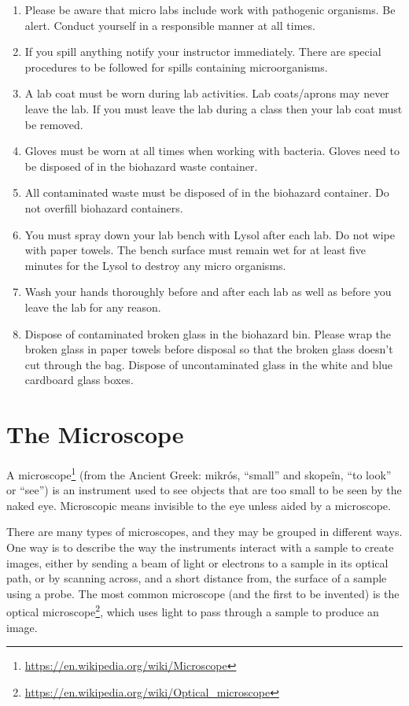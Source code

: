 \documentclass[]{book}
\providecommand{\tightlist}{%
  \setlength{\itemsep}{0pt}\setlength{\parskip}{0pt}}
\let\rmarkdownfootnote\footnote%
\def\footnote{\protect\rmarkdownfootnote}
\renewcommand{\href}[2]{#2\footnote{\url{#1}}}
\theoremstyle{definition}
\theoremstyle{definition}
\theoremstyle{definition}
\theoremstyle{remark}
\begin{document}
\begin{enumerate}
\def\labelenumi{\arabic{enumi}.}
\setcounter{enumi}{37}
\tightlist
\item
  Please be aware that micro labs include work with pathogenic
  organisms. Be alert. Conduct yourself in a responsible manner at all
  times.
\item
  If you spill anything notify your instructor immediately. There are
  special procedures to be followed for spills containing
  microorganisms.
\item
  A lab coat must be worn during lab activities. Lab coats/aprons may
  never leave the lab. If you must leave the lab during a class then
  your lab coat must be removed.
\item
  Gloves must be worn at all times when working with bacteria. Gloves
  need to be disposed of in the biohazard waste container.
\item
  All contaminated waste must be disposed of in the biohazard container.
  Do not overfill biohazard containers.
\item
  You must spray down your lab bench with Lysol after each lab. Do not
  wipe with paper towels. The bench surface must remain wet for at least
  five minutes for the Lysol to destroy any micro organisms.
\item
  Wash your hands thoroughly before and after each lab as well as before
  you leave the lab for any reason.
\item
  Dispose of contaminated broken glass in the biohazard bin. Please wrap
  the broken glass in paper towels before disposal so that the broken
  glass doesn't cut through the bag. Dispose of uncontaminated glass in
  the white and blue cardboard glass boxes.
\end{enumerate}

\chapter{The Microscope}\label{the-microscope}

A \href{https://en.wikipedia.org/wiki/Microscope}{microscope} (from the
Ancient Greek: mikrós, ``small'' and skopeîn, ``to look'' or ``see'') is
an instrument used to see objects that are too small to be seen by the
naked eye. Microscopic means invisible to the eye unless aided by a
microscope.

There are many types of microscopes, and they may be grouped in
different ways. One way is to describe the way the instruments interact
with a sample to create images, either by sending a beam of light or
electrons to a sample in its optical path, or by scanning across, and a
short distance from, the surface of a sample using a probe. The most
common microscope (and the first to be invented) is the
\href{https://en.wikipedia.org/wiki/Optical_microscope}{optical
microscope}, which uses light to pass through a sample to produce an
image.
\end{document}

